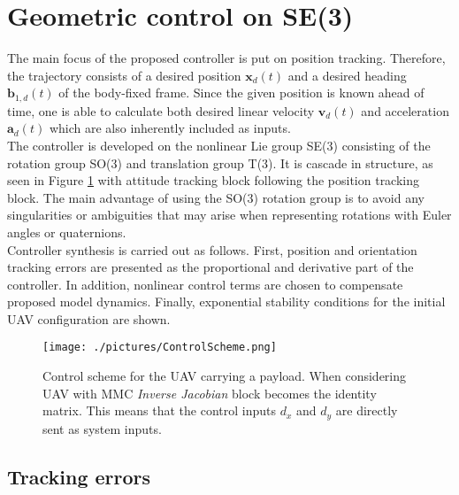 \section{Geometric control on SE(3)} \label{sec:control}

The main focus of the proposed controller is put on position tracking. Therefore, the trajectory consists of a desired position $\textbf{x}_d(t)$ and a desired heading $\textbf{b}_{1,d}(t)$ of the body-fixed frame. Since the given position is known ahead of time, one is able to calculate both desired linear velocity $\textbf{v}_d(t)$ and acceleration $\textbf{a}_d(t)$ which are also inherently included as inputs. \\
The controller is developed on the nonlinear Lie group SE(3) consisting of the rotation group SO(3) and translation group T(3). It is cascade in structure, as seen in Figure \ref{fig:control_scheme} with attitude tracking block following the position tracking block. The main advantage of using the SO(3) rotation group is to avoid any singularities or ambiguities that may arise when representing rotations with Euler angles or quaternions. \\
Controller synthesis is carried out as follows. First, position and orientation tracking errors are presented as the proportional and derivative part of the controller. In addition, nonlinear control terms are chosen to compensate proposed model dynamics. Finally, exponential stability conditions for the initial UAV configuration are shown.

\begin{figure}
	\centering
	\texttt{[image: ./pictures/ControlScheme.png]}	
	\caption{Control scheme for the UAV carrying a payload. When considering UAV with MMC \textit{Inverse Jacobian} block becomes the identity matrix. This means that the control inputs $d_x$ and $d_y$ are directly sent as system inputs.}
	\label{fig:control_scheme}
\end{figure}

\subsection{Tracking errors}


